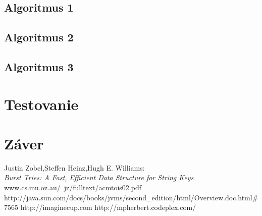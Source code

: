 \documentclass[12pt,notitlepage]{report}
\begin{document}
\section{Algoritmus 1}
\section{Algoritmus 2}
\section{Algoritmus 3}
\chapter{Testovanie}

\chapter{Záver}
\newpage
{}
\begin{thebibliography}{99}
Justin Zobel,Steffen Heinz,Hugh E. Williams:\\
{\it Burst Tries: A Fast, Efficient Data Structure for String Keys} www.cs.mu.oz.au/~jz/fulltext/acmtois02.pdf
http://java.sun.com/docs/books/jvms/second\_edition/html/Overview.doc.html\#7565
http://imaginecup.com
http://mpherbert.codeplex.com/
\end{thebibliography}
\end{document}
